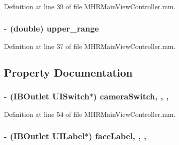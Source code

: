 Definition at line 39 of file M\+H\+R\+Main\+View\+Controller.\+mm.

\hypertarget{category_m_h_r_main_view_controller_07_08_a2cae5817c804f84f5e8db9531d8258c9}{
\subsubsection[{upper\+\_\+range}]{\setlength{\rightskip}{0pt plus 5cm}-\/ (double) upper\+\_\+range\hspace{0.3cm}{\ttfamily [protected]}}}\label{category_m_h_r_main_view_controller_07_08_a2cae5817c804f84f5e8db9531d8258c9}


Definition at line 37 of file M\+H\+R\+Main\+View\+Controller.\+mm.



\subsection{Property Documentation}
\hypertarget{category_m_h_r_main_view_controller_07_08_a64545a3386e0d53f59af539582caafd4}{
\subsubsection[{camera\+Switch}]{\setlength{\rightskip}{0pt plus 5cm}-\/ (I\+B\+Outlet U\+I\+Switch$\ast$) camera\+Switch\hspace{0.3cm}{\ttfamily [read]}, {\ttfamily [write]}, {\ttfamily [nonatomic]}, {\ttfamily [weak]}}}\label{category_m_h_r_main_view_controller_07_08_a64545a3386e0d53f59af539582caafd4}


Definition at line 54 of file M\+H\+R\+Main\+View\+Controller.\+mm.

\hypertarget{category_m_h_r_main_view_controller_07_08_a2457cf5b05fac6f6cb9483997159f5f6}{
\subsubsection[{face\+Label}]{\setlength{\rightskip}{0pt plus 5cm}-\/ (I\+B\+Outlet U\+I\+Label$\ast$) face\+Label\hspace{0.3cm}{\ttfamily [read]}, {\ttfamily [write]}, {\ttfamily [nonatomic]}, {\ttfamily [weak]}}}\label{category_m_h_r_main_view_controller_07_08_a2457cf5b05fac6f6cb9483997159f5f6}


